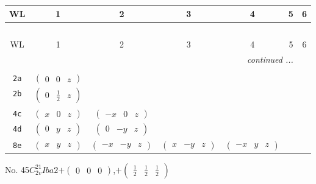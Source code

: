 \documentclass[fleqn,9pt,landscape]{jsarticle}
\begin{document}
\begin{center}
\renewcommand{\arraystretch}{1.2}
\begin{longtable}{ccccccc}
 \hline \hline
WL & 1 & 2 & 3 & 4 & 5 & 6 \\ \hline \endfirsthead

\multicolumn{6}{l}{\tablename\ \thetable{}} \\
 \hline \hline
WL & 1 & 2 & 3 & 4 & 5 & 6 \\ \hline \endhead

 \hline \hline
\multicolumn{6}{r}{\footnotesize\it continued ...} \\ \endfoot

 \hline \hline
\multicolumn{6}{r}{} \\ \endlastfoot

{\tt 2a} & $ \begin{pmatrix} 0 & 0 & z \end{pmatrix} $ & $  $ & $  $ & $  $ \\ \hline
{\tt 2b} & $ \begin{pmatrix} 0 & \frac{1}{2} & z \end{pmatrix} $ & $  $ & $  $ & $  $ \\ \hline
{\tt 4c} & $ \begin{pmatrix} x & 0 & z \end{pmatrix} $ & $ \begin{pmatrix} - x & 0 & z \end{pmatrix} $ & $  $ & $  $ \\ \hline
{\tt 4d} & $ \begin{pmatrix} 0 & y & z \end{pmatrix} $ & $ \begin{pmatrix} 0 & - y & z \end{pmatrix} $ & $  $ & $  $ \\ \hline
{\tt 8e} & $ \begin{pmatrix} x & y & z \end{pmatrix} $ & $ \begin{pmatrix} - x & - y & z \end{pmatrix} $ & $ \begin{pmatrix} x & - y & z \end{pmatrix} $ & $ \begin{pmatrix} - x & y & z \end{pmatrix} $ \\
\end{longtable}
\end{center}
\newpage
No. 45\quad$C_{2v}^{21}$\quad$Iba2$\quad[ orthorhombic ]\quad$+\begin{pmatrix} 0 & 0 & 0 \end{pmatrix}$,\quad $+\begin{pmatrix} \frac{1}{2} & \frac{1}{2} & \frac{1}{2} \end{pmatrix}$
\end{document}
